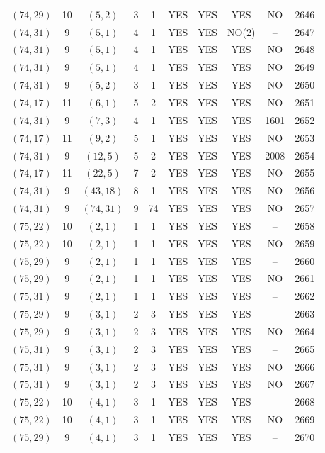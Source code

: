 \begin{longtable}{|c|c|c|c|c|c|c|c|c|c|}
$(74, 29)$ & 10 & $(5, 2)$ & 3 & 1 & YES & YES & YES & NO & 2646\\
$(74, 31)$ & 9 & $(5, 1)$ & 4 & 1 & YES & YES & NO(2) & -- & 2647\\
$(74, 31)$ & 9 & $(5, 1)$ & 4 & 1 & YES & YES & YES & NO & 2648\\
$(74, 31)$ & 9 & $(5, 1)$ & 4 & 1 & YES & YES & YES & NO & 2649\\
$(74, 31)$ & 9 & $(5, 2)$ & 3 & 1 & YES & YES & YES & NO & 2650\\
$(74, 17)$ & 11 & $(6, 1)$ & 5 & 2 & YES & YES & YES & NO & 2651\\
$(74, 31)$ & 9 & $(7, 3)$ & 4 & 1 & YES & YES & YES & 1601 & 2652\\
$(74, 17)$ & 11 & $(9, 2)$ & 5 & 1 & YES & YES & YES & NO & 2653\\
$(74, 31)$ & 9 & $(12, 5)$ & 5 & 2 & YES & YES & YES & 2008 & 2654\\
$(74, 17)$ & 11 & $(22, 5)$ & 7 & 2 & YES & YES & YES & NO & 2655\\
$(74, 31)$ & 9 & $(43, 18)$ & 8 & 1 & YES & YES & YES & NO & 2656\\
$(74, 31)$ & 9 & $(74, 31)$ & 9 & 74 & YES & YES & YES & NO & 2657\\
$(75, 22)$ & 10 & $(2, 1)$ & 1 & 1 & YES & YES & YES & -- & 2658\\
$(75, 22)$ & 10 & $(2, 1)$ & 1 & 1 & YES & YES & YES & NO & 2659\\
$(75, 29)$ & 9 & $(2, 1)$ & 1 & 1 & YES & YES & YES & -- & 2660\\
$(75, 29)$ & 9 & $(2, 1)$ & 1 & 1 & YES & YES & YES & NO & 2661\\
$(75, 31)$ & 9 & $(2, 1)$ & 1 & 1 & YES & YES & YES & -- & 2662\\
$(75, 29)$ & 9 & $(3, 1)$ & 2 & 3 & YES & YES & YES & -- & 2663\\
$(75, 29)$ & 9 & $(3, 1)$ & 2 & 3 & YES & YES & YES & NO & 2664\\
$(75, 31)$ & 9 & $(3, 1)$ & 2 & 3 & YES & YES & YES & -- & 2665\\
$(75, 31)$ & 9 & $(3, 1)$ & 2 & 3 & YES & YES & YES & NO & 2666\\
$(75, 31)$ & 9 & $(3, 1)$ & 2 & 3 & YES & YES & YES & NO & 2667\\
$(75, 22)$ & 10 & $(4, 1)$ & 3 & 1 & YES & YES & YES & -- & 2668\\
$(75, 22)$ & 10 & $(4, 1)$ & 3 & 1 & YES & YES & YES & NO & 2669\\
$(75, 29)$ & 9 & $(4, 1)$ & 3 & 1 & YES & YES & YES & -- & 2670\\

\end{longtable}
